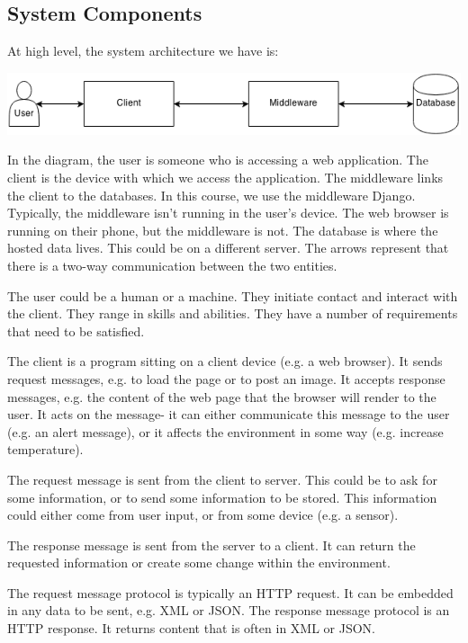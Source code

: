 \documentclass[a4paper, openany]{memoir}
\begin{document}
    \subsection{System Components}
    At high level, the system architecture we have is:
    \begin{center}
        \includegraphics[scale=0.8]{src/L1I1.png}
    \end{center}
    In the diagram, the user is someone who is accessing a web application. The client is the device with which we access the application. The middleware links the client to the databases. In this course, we use the middleware Django. Typically, the middleware isn't running in the user's device. The web browser is running on their phone, but the middleware is not. The database is where the hosted data lives. This could be on a different server. The arrows represent that there is a two-way communication between the two entities.

    The user could be a human or a machine. They initiate contact and interact with the client. They range in skills and abilities. They have a number of requirements that need to be satisfied. 

    The client is a program sitting on a client device (e.g. a web browser). It sends request messages, e.g. to load the page or to post an image. It accepts response messages, e.g. the content of the web page that the browser will render to the user. It acts on the message- it can either communicate this message to the user (e.g. an alert message), or it affects the environment in some way (e.g. increase temperature).

    The request message is sent from the client to server. This could be to ask for some information, or to send some information to be stored. This information could either come from user input, or from some device (e.g. a sensor).

    The response message is sent from the server to a client. It can return the requested information or create some change within the environment.

    The request message protocol is typically an HTTP request. It can be embedded in any data to be sent, e.g. XML or JSON. The response message protocol is an HTTP response. It returns content that is often in XML or JSON.
\end{document}
